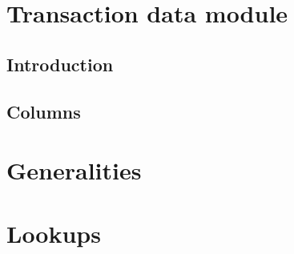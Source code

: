 
\section{Transaction data module}   \label{user txn data: generalities}
\subsection{Introduction}           \label{user txn data: intro}           
\subsection{Columns}                \label{user txn data: columns}         

\section{Generalities}              \label{user txn data: generalities}    
\iffalse  \fi                       \label{user txn data: processing}      
\section{Lookups}                   \label{user txn data: lookups}         

